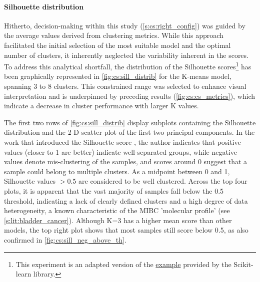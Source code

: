 \begin{figure}[H]
    \label{fig:cs:cs_metrics_heatmap}
\end{figure}



\paragraph*{Silhouette distribution}

Hitherto, decision-making within this study (\cref{s:cs:right_config}) was guided by the average values derived from clustering metrics. While this approach facilitated the initial selection of the most suitable model and the optimal number of clusters, it inherently neglected the variability inherent in the scores. To address this analytical shortfall, the distribution of the Silhouette scores\footnote{This experiment is an adapted version of the \href{https://tinyurl.com/sillhouete-distrib}{example} provided by the Scikit-learn library.} has been graphically represented in \cref{fig:cs:sill_distrib} for the K-means model, spanning 3 to 8 clusters. This constrained range was selected to enhance visual interpretation and is underpinned by preceding results (\cref{fig:cs:cs_metrics}), which indicate a decrease in cluster performance with larger K values.

The first two rows of \cref{fig:cs:sill_distrib} display subplots containing the Silhouette distribution and the 2-D scatter plot of the first two principal components. In the work that introduced the Silhouette score \citep{Rousseeuw1987-wy}, the author indicates that positive values (closer to 1 are better) indicate well-separated groups, while negative values denote mis-clustering of the samples, and scores around 0 suggest that a sample could belong to multiple clusters. As a midpoint between 0 and 1, Silhouette values $>0.5$ are considered to be well clustered. Across the top four plots, it is apparent that the vast majority of samples fall below the 0.5 threshold, indicating a lack of clearly defined clusters and a high degree of data heterogeneity, a known characteristic of the MIBC 'molecular profile' (see \cref{s:lit:bladder_cancer}). Although K=3 has a higher mean score than other models, the top right plot shows that most samples still score below 0.5, as also confirmed in \cref{fig:cs:sill_neg_above_th}.


